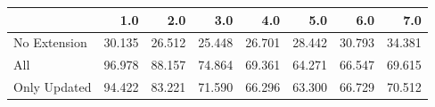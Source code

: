 \begin{tabular}{lrrrrrrr}
\toprule
{} &    1.0 &    2.0 &    3.0 &    4.0 &    5.0 &    6.0 &    7.0 \\
\midrule
No Extension & 30.135 & 26.512 & 25.448 & 26.701 & 28.442 & 30.793 & 34.381 \\
All          & 96.978 & 88.157 & 74.864 & 69.361 & 64.271 & 66.547 & 69.615 \\
Only Updated & 94.422 & 83.221 & 71.590 & 66.296 & 63.300 & 66.729 & 70.512 \\
\bottomrule
\end{tabular}
